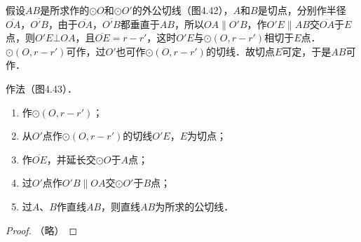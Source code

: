 \begin{analyze}
  假设$AB$是所求作的$\odot O$和$\odot O'$的外公切线（图4.42），$A$和$B$是切点，分别作半径$\overline{OA}$，$\overline{O'B}$，由于$\overline{OA}$，$\overline{O'B}$都垂直于$AB$，所以$OA\parallel O'B$，作$O'E\parallel AB$交$\overline{OA}$于$E$点，则$O'E\bot OA$，且$\overline{OE}=r-r'$，这时$O'E$与$\odot (O,r-r')$相切于$E$点．$\odot (O,r-r')$可作，过$O'$也可作$\odot (O,r-r')$的切线．故切点$E$可定，于是$AB$可作．
\end{analyze}

作法（图4.43）．
\begin{enumerate}
\item 作$\odot (O,r-r')$；
\item 从$O'$点作$\odot (O,r-r')$的切线$O'E$，$E$为切点；
\item 作$\overline{OE}$，并延长交$\odot O$于$A$点；
\item 过$O'$点作$O'B\parallel OA$交$\odot O'$于$B$点；
\item 过$A$、$B$作直线$AB$，则直线$AB$为所求的公切线．
\end{enumerate}

\begin{proof}
  （略）
\end{proof}

